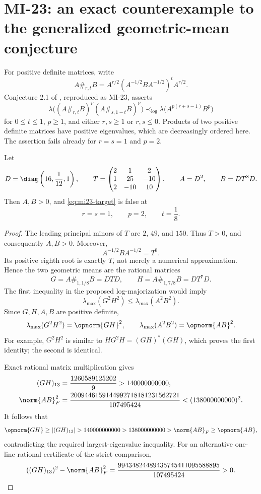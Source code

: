 \section{MI-23: an exact counterexample to the generalized geometric-mean conjecture}
\label{sec:mi23}
For positive definite matrices, write
\[
 A\#_{r,t}B=A^{r/2}(A^{-1/2}BA^{-1/2})^tA^{r/2}.
\]
Conjecture 2.1 of \cite{GAMA2021}, reproduced as MI-23, asserts
\begin{equation}\label{eq:mi23-target}
 \lambda\bigl((A\#_{r,t}B)^p(A\#_{s,1-t}B)^p\bigr)
 \prec_{\log}\lambda\bigl(A^{p(r+s-1)}B^p\bigr)
\end{equation}
for $0\leq t\leq1$, $p\geq1$, and either $r,s\geq1$ or $r,s\leq0$. Products of two positive definite matrices have positive eigenvalues, which are decreasingly ordered here. The assertion fails already for $r=s=1$ and $p=2$.

\begin{theorem}\label{thm:mi23}
Let
\[
 D=\diag\left(16,\frac1{12},1\right),\qquad
 T=\begin{pmatrix}2&1&2\\1&25&-10\\2&-10&10\end{pmatrix},
 \qquad A=D^2,\qquad B=DT^8D.
\]
Then $A,B>0$, and \eqref{eq:mi23-target} is false at
\[
 r=s=1,\qquad p=2,\qquad t=\frac18.
\]
\end{theorem}
\begin{proof}
The leading principal minors of $T$ are $2$, $49$, and $150$. Thus $T>0$, and consequently $A,B>0$. Moreover,
\[
 A^{-1/2}BA^{-1/2}=T^8.
\]
Its positive eighth root is exactly $T$, not merely a numerical approximation. Hence the two geometric means are the rational matrices
\[
 G=A\#_{1,1/8}B=DTD,\qquad
 H=A\#_{1,7/8}B=DT^7D.
\]
The first inequality in the proposed log-majorization would imply
\[
 \lambda_{\max}(G^2H^2)\leq\lambda_{\max}(A^2B^2).
\]
Since $G,H,A,B$ are positive definite,
\[
 \lambda_{\max}(G^2H^2)=\opnorm{GH}^2,
 \qquad \lambda_{\max}(A^2B^2)=\opnorm{AB}^2.
\]
For example, $G^2H^2$ is similar to $HG^2H=(GH)^*(GH)$, which proves the first identity; the second is identical.

Exact rational matrix multiplication gives
\begin{align*}
 (GH)_{13}&=\frac{1260589125202}{9}>140000000000,\\
 \norm{AB}_F^2&=\frac{2009446159144992718181231562721}{107495424}
 <(138000000000)^2.
\end{align*}
It follows that
\[
 \opnorm{GH}\geq |(GH)_{13}|>140000000000
 >138000000000>\norm{AB}_F\geq\opnorm{AB},
\]
contradicting the required largest-eigenvalue inequality.
For an alternative one-line rational certificate of the strict comparison,
\[
 ((GH)_{13})^2-\norm{AB}_F^2
 =\frac{99434824489435745411095588895}{107495424}>0.
\]
\end{proof}

